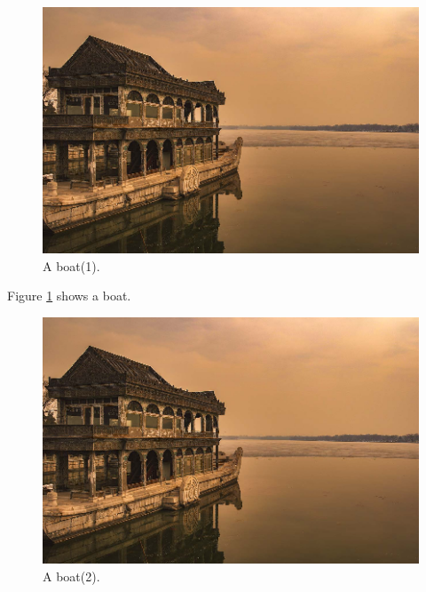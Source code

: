 \documentclass{article}
\begin{document}
	\begin{figure}
  		\includegraphics[width=\linewidth]{boat.png}
  		\caption{A boat(1).}
  		\label{fig:boat1}
	\end{figure}

Figure \ref{fig:boat1} shows a boat.

	\begin{figure}[h!]
  		\includegraphics[width=\linewidth]{boat.png}
  		\caption{A boat(2).}
  		\label{fig:boat2}
	\end{figure}
\end{document}
